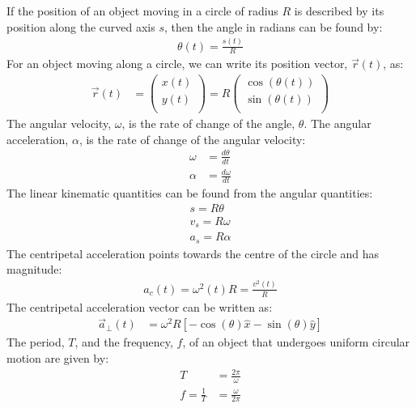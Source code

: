 \begin{importantEquations}
If the position of an object moving in a circle of radius $R$ is described by its position along the curved axis $s$, then the angle in radians can be found by:
\begin{align*}
\theta(t)=\frac{s(t)}{R}
\end{align*}
For an object moving along a circle, we can write its position vector, $\vec r(t)$, as:
\begin{align*}
\vec r(t)&= \begin{pmatrix}
          x(t) \\
          y(t) \\
        \end{pmatrix}
        =R \begin{pmatrix}
          \cos(\theta(t)) \\
          \sin(\theta(t)) \\
        \end{pmatrix}
\end{align*}
The angular velocity, $\omega$, is the rate of change of the angle, $\theta$. The angular acceleration, $\alpha$, is the rate of change of the angular velocity:
\begin{align*}
\omega &= \frac{d\theta}{dt}\\
\alpha &= \frac{d\omega}{dt}
\end{align*}
The linear kinematic quantities can be found from the angular quantities:
\begin{align*}
s=R\theta\\
v_s=R\omega\\
a_s=R\alpha
\end{align*}
The centripetal acceleration points towards the centre of the circle and has magnitude:
\begin{align*}
a_c(t) = \omega^2(t)R = \frac{v^2(t)}{R}
\end{align*}
The centripetal acceleration vector can be written as:
\begin{align*}
\vec a_{\bot}(t)&=\omega^2 R[-\cos(\theta)\hat x-\sin(\theta)\hat y]
\end{align*}
The period, $T$, and the frequency, $f$, of an object that undergoes uniform circular motion are given by:
\begin{align*}
T&=\frac{2\pi}{\omega}\\
f=\frac{1}{T}&=\frac{\omega}{2\pi}
\end{align*}
\end{importantEquations}

